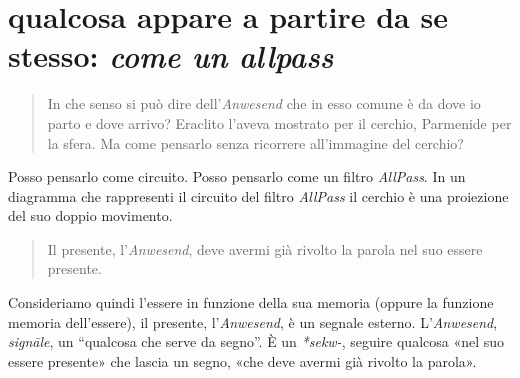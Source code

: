 \section{qualcosa appare a partire da se stesso: \emph{come un allpass}}

\begin{quote}
  \begin{sf}
    \small
    In che senso si può dire dell'\emph{Anwesend} che in esso comune è da dove
    io parto e dove arrivo? Eraclito l'aveva mostrato per il cerchio, Parmenide
    per la sfera. Ma come pensarlo senza ricorrere all'immagine del cerchio?
  \end{sf}
\end{quote}

Posso pensarlo come circuito. Posso pensarlo come un filtro \emph{AllPass}. In
un diagramma che rappresenti il circuito del filtro \emph{AllPass} il cerchio è
una proiezione del suo doppio movimento.

\begin{figure}[ht]
  \centering
  \label{tikz:ciclobase}
\end{figure}

\begin{quote}
  \begin{sf}
    \small
    Il presente, l'\emph{Anwesend}, deve avermi già rivolto la parola nel suo
    essere presente.
  \end{sf}
\end{quote}

\begin{figure}[ht]
  \centering
  \label{tikz:ciclobase}
\end{figure}

Consideriamo quindi l'essere in funzione della sua memoria (oppure la funzione
memoria dell'essere), il presente, l'\emph{Anwesend}, è un segnale esterno.
L'\emph{Anwesend}, \emph{signāle}, un “qualcosa che serve da segno”. È un
\emph{*sekw-}, seguire qualcosa «nel suo essere presente» che lascia un segno,
«che deve avermi già rivolto la parola».

